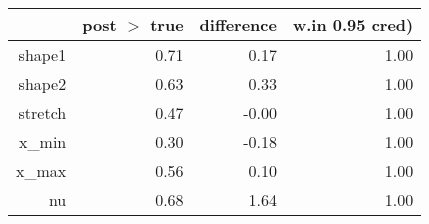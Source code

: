 \begin{table}[ht]
\centering
\begin{tabular}{rrrr}
  \hline
 & post $>$ true & difference & w.in 0.95 cred) \\ 
  \hline
shape1 & 0.71 & 0.17 & 1.00 \\ 
  shape2 & 0.63 & 0.33 & 1.00 \\ 
  stretch & 0.47 & -0.00 & 1.00 \\ 
  x\_min & 0.30 & -0.18 & 1.00 \\ 
  x\_max & 0.56 & 0.10 & 1.00 \\ 
  nu & 0.68 & 1.64 & 1.00 \\ 
   \hline
\end{tabular}
\end{table}
